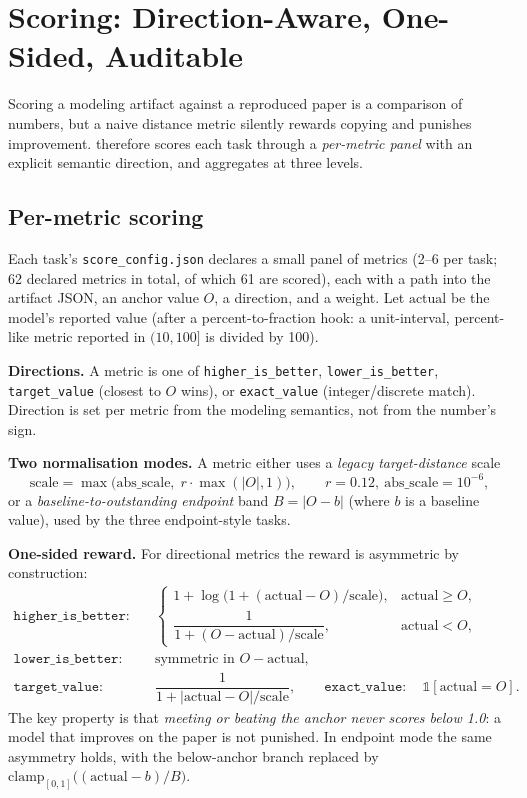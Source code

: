 \section{Scoring: Direction-Aware, One-Sided, Auditable}
\label{sec:scoring}

Scoring a modeling artifact against a reproduced paper is a comparison of numbers, but a naive distance metric silently rewards copying and punishes improvement. \bench{} therefore scores each task through a \emph{per-metric panel} with an explicit semantic direction, and aggregates at three levels.

\subsection{Per-metric scoring}
\label{sec:per-metric}
Each task's \texttt{score\_config.json} declares a small panel of metrics (2--6 per task; 62 declared metrics in total, of which 61 are scored), each with a path into the artifact JSON, an anchor value $O$, a direction, and a weight. Let $\mathrm{actual}$ be the model's reported value (after a percent-to-fraction hook: a unit-interval, percent-like metric reported in $(10,100]$ is divided by 100).

\textbf{Directions.} A metric is one of \texttt{higher\_is\_better}, \texttt{lower\_is\_better}, \texttt{target\_value} (closest to $O$ wins), or \texttt{exact\_value} (integer/discrete match). Direction is set per metric from the modeling semantics, not from the number's sign.

\textbf{Two normalisation modes.} A metric either uses a \emph{legacy target-distance} scale
\[
\mathrm{scale} = \max\bigl(\mathrm{abs\_scale},\; r\cdot\max(|O|,1)\bigr),\qquad r = 0.12,\ \mathrm{abs\_scale}=10^{-6},
\]
or a \emph{baseline-to-outstanding endpoint} band $B = |O - b|$ (where $b$ is a baseline value), used by the three endpoint-style tasks.

\textbf{One-sided reward.} For directional metrics the reward is asymmetric by construction:
\begin{align}
\texttt{higher\_is\_better}:&\quad
\begin{cases}
1 + \log\!\bigl(1 + (\mathrm{actual}-O)/\mathrm{scale}\bigr), & \mathrm{actual}\ge O,\\[2pt]
\dfrac{1}{1 + (O-\mathrm{actual})/\mathrm{scale}}, & \mathrm{actual}< O,
\end{cases}\\
\texttt{lower\_is\_better}:&\quad \text{symmetric in } O-\mathrm{actual},\\
\texttt{target\_value}:&\quad \dfrac{1}{1 + |\mathrm{actual}-O|/\mathrm{scale}},\qquad
\texttt{exact\_value}:\quad \mathbb{1}[\mathrm{actual}=O].
\end{align}
The key property is that \emph{meeting or beating the anchor never scores below 1.0}: a model that improves on the paper is not punished. In endpoint mode the same asymmetry holds, with the below-anchor branch replaced by $\mathrm{clamp}_{[0,1]}\bigl((\mathrm{actual}-b)/B\bigr)$.


